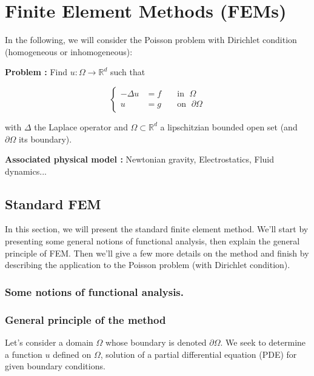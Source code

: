 \section{Finite Element Methods (FEMs)}
\graphicspath{{images/FEM}}

In the following, we will consider the Poisson problem with Dirichlet condition (homogeneous or inhomogeneous):

\textbf{Problem :} Find $u : \Omega \rightarrow \mathbb{R}^d$ such that

\begin{equation*}
	\left\{
		\begin{aligned}
			-\Delta u &= f \; &&\text{in } \; \Omega \\
			u&=g \; &&\text{on } \; \partial\Omega
		\end{aligned}
	\right.
\end{equation*}

with $\Delta$ the Laplace operator and $\Omega\subset\mathbb{R}^d$ a lipschitzian bounded open set (and $\partial\Omega$ its boundary).

\textbf{Associated physical model :} Newtonian gravity, Electrostatics, Fluid dynamics...

\subsection{Standard FEM}

In this section, we will present the standard finite element method. We'll start by presenting some general notions of functional analysis, then explain the general principle of FEM. Then we'll give a few more details on the method and finish by describing the application to the Poisson problem (with Dirichlet condition).

\subsubsection{Some notions of functional analysis.}


\subsubsection{General principle of the method}

Let's consider a domain $\Omega$ whose boundary is denoted $\partial\Omega$. We seek to determine a function $u$ defined on $\Omega$, solution of a partial differential equation (PDE) for given boundary conditions.

